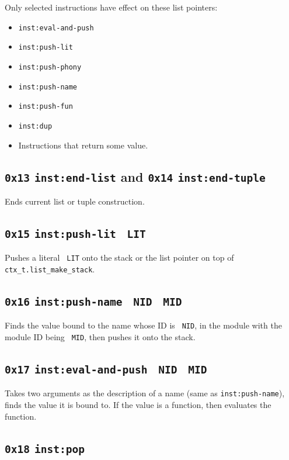 \documentclass{report}
\newcommand{\mtilde}[1]{\textasciitilde}
\newcommand{\marg}[1]{\texttt{\mtilde ~#1}}
\newcommand{\inst}[1] {\texttt{inst:#1}}
\begin{document}
\begin{mdframed}[style=detail]
  Only selected instructions have effect on these list pointers:
  \begin{itemize}
  \item \inst{eval-and-push}
  \item \inst{push-lit}
  \item \inst{push-phony}
  \item \inst{push-name}
  \item \inst{push-fun}
  \item \inst{dup}
  \item Instructions that return some value.
  \end{itemize}
\end{mdframed}

\subsection{\texttt{0x13} \inst{end-list} and \texttt{0x14} \inst{end-tuple}}

Ends current list or tuple construction.

\subsection{\texttt{0x15} \inst{push-lit} \marg{LIT}}

Pushes a literal \marg{LIT} onto the stack or the list pointer on top of \texttt{ctx\_t.list\_make\_stack}.

\subsection{\texttt{0x16} \inst{push-name} \marg{NID} \marg{MID}}

Finds the value bound to the name whose ID is \marg{NID}, in the module with the module ID being \marg{MID}, then pushes it onto the stack.

\subsection{\texttt{0x17} \inst{eval-and-push} \marg{NID} \marg{MID}}

Takes two arguments as the description of a name (same as \inst{push-name}), finds the value it is bound to. If the value is a function, then evaluates the function.

\subsection{\texttt{0x18} \inst{pop} }
\end{document}
